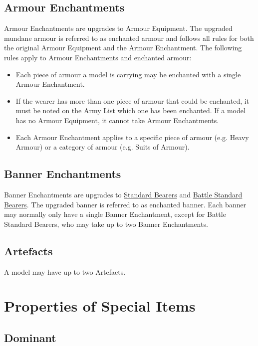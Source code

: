 \subsection{Armour Enchantments}
\label{armour_enchantments}

Armour Enchantments are upgrades to Armour Equipment. The upgraded mundane armour is referred to as enchanted armour and follows all rules for both the original Armour Equipment and the Armour Enchantment. The following rules apply to Armour Enchantments and enchanted armour:
\begin{itemize}
\item Each piece of armour a model is carrying may be enchanted with a single Armour Enchantment.
\item If the wearer has more than one piece of armour that could be enchanted, it must be noted on the Army List which one has been enchanted. If a model has no Armour Equipment, it cannot take Armour Enchantments.
\item Each Armour Enchantment applies to a specific piece of armour (e.g. Heavy Armour) or a category of armour (e.g. Suits of Armour).
\end{itemize}

\subsection{Banner Enchantments}
\label{banner_enchantments}

Banner Enchantments are upgrades to \hyperref[standard_bearer]{Standard Bearers} and \hyperref[bsb]{Battle Standard Bearers}. The upgraded banner is referred to as enchanted banner. Each banner may normally only have a single Banner Enchantment, except for Battle Standard Bearers, who may take up to two Banner Enchantments.

\subsection{Artefacts}
\label{artefacts}

A model may have up to two Artefacts.

\section{Properties of Special Items}

\subsection{Dominant}
\label{dominant}

